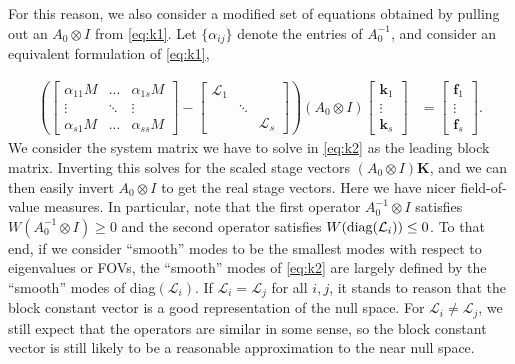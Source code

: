 \documentclass[a4paper,10pt]{article}
\begin{document}
For this reason, we also consider a modified set of equations obtained by pulling
out an $A_0\otimes I$ from \eqref{eq:k1}. Let $\{\alpha_{ij}\}$ denote the entries
of $A_0^{-1}$, and consider an equivalent formulation of \eqref{eq:k1},

%
\begin{align}\label{eq:k2}
\left( \begin{bmatrix} \alpha_{11} M & ... & \alpha_{1s}M  \\ \vdots & \ddots & \vdots
		\\ \alpha_{s1}M &  ... & \alpha_{ss}M\end{bmatrix}
	- \begin{bmatrix} \mathcal{L}_1 &  \\
	 & \ddots & \\ & & \mathcal{L}_s \end{bmatrix} \right) 
	(A_0\otimes I)
	\begin{bmatrix} \mathbf{k}_1 \\ \vdots \\ \mathbf{k}_s \end{bmatrix} 
& = \begin{bmatrix} \mathbf{f}_1 \\ \vdots \\ \mathbf{f}_s \end{bmatrix}.
\end{align}
%
We consider the system matrix we have to solve in \eqref{eq:k2} as the leading
block matrix. Inverting this solves for the scaled stage vectors $(A_0\otimes I)\mathbf{K}$,
and we can then easily invert $A_0\otimes I$ to get the real stage vectors.
Here we have nicer field-of-value measures. In particular, note that the first
operator $A_0^{-1}\otimes I$ satisfies $W(A_0^{-1}\otimes I) \geq 0$ and the second operator
satisfies $W(\textnormal{diag}(\mathcal{L}_i)) \leq 0$. To that end, if we consider
``smooth'' modes to be the smallest modes with respect to eigenvalues or FOVs,
the ``smooth'' modes of \eqref{eq:k2} are largely defined by the ``smooth'' modes
of diag$(\mathcal{L}_i)$. If $\mathcal{L}_i = \mathcal{L}_j$ for all $i,j$, it
stands to reason that the block constant vector is a good representation of the
null space. For $\mathcal{L}_i \neq \mathcal{L}_j$, we still expect that the
operators are similar in some sense, so the block constant vector is still
likely to be a reasonable approximation to the near null space.

\end{document}
